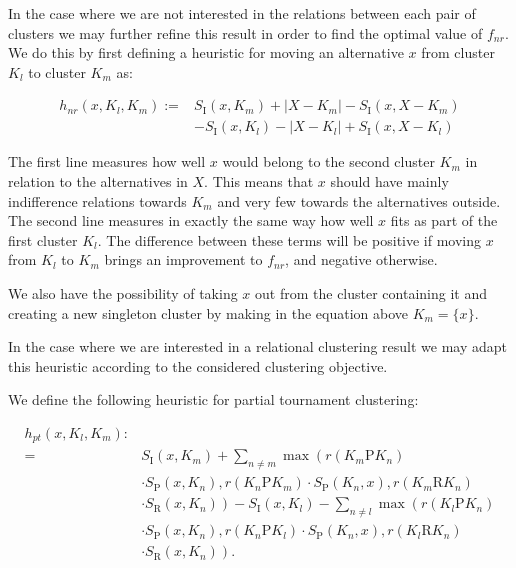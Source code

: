 \documentclass[10pt]{article}
\begin{document}
In the case where we are not interested in the relations between each pair of clusters we may further refine this result in order to find the optimal value of $f_{n r}$. We do this by first defining a heuristic for moving an alternative $x$ from cluster $K_{l}$ to cluster $K_{m}$ as:

$$
\begin{aligned}
h_{n r}\left(x, K_{l}, K_{m}\right):= & S_{\mathrm{I}}\left(x, K_{m}\right)+\left|X-K_{m}\right|-S_{\mathrm{I}}\left(x, X-K_{m}\right) \\
& -S_{\mathrm{I}}\left(x, K_{l}\right)-\left|X-K_{l}\right|+S_{\mathrm{I}}\left(x, X-K_{l}\right)
\end{aligned}
$$

The first line measures how well $x$ would belong to the second cluster $K_{m}$ in relation to the alternatives in $X$. This means that $x$ should have mainly indifference relations towards $K_{m}$ and very few towards the alternatives outside. The second line measures in exactly the same way how well $x$ fits as part of the first cluster $K_{l}$. The difference between these terms will be positive if moving $x$ from $K_{l}$ to $K_{m}$ brings an improvement to $f_{n r}$, and negative otherwise.

We also have the possibility of taking $x$ out from the cluster containing it and creating a new singleton cluster by making in the equation above $K_{m}=\{x\}$.

In the case where we are interested in a relational clustering result we may adapt this heuristic according to the considered clustering objective.

We define the following heuristic for partial tournament clustering:

$$
\begin{aligned}
h_{p t}\left(x, K_{l}, K_{m}\right): & \\
= & S_{\mathrm{I}}\left(x, K_{m}\right)+\sum_{n \neq m} \max \left(r\left(K_{m} \mathrm{P} K_{n}\right)\right. \\
& \cdot S_{\mathrm{P}}\left(x, K_{n}\right), r\left(K_{n} \mathrm{P} K_{m}\right) \cdot S_{\mathrm{P}}\left(K_{n}, x\right), r\left(K_{m} \mathrm{R} K_{n}\right) \\
& \left.\cdot S_{\mathrm{R}}\left(x, K_{n}\right)\right)-S_{\mathrm{I}}\left(x, K_{l}\right)-\sum_{n \neq l} \max \left(r\left(K_{l} \mathrm{P} K_{n}\right)\right. \\
& \cdot S_{\mathrm{P}}\left(x, K_{n}\right), r\left(K_{n} \mathrm{P} K_{l}\right) \cdot S_{\mathrm{P}}\left(K_{n}, x\right), r\left(K_{l} \mathrm{R} K_{n}\right) \\
& \left.\cdot S_{\mathrm{R}}\left(x, K_{n}\right)\right) .
\end{aligned}
$$
\end{document}
